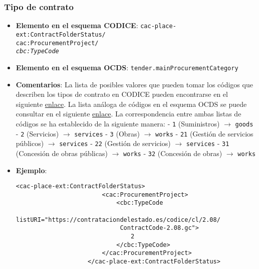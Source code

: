         \subsubsection{Tipo de contrato}
        \begin{itemize}
            \item \textbf{Elemento en el esquema CODICE}:
                \tabto{7.6cm} \texttt{cac-place-ext:ContractFolderStatus/} \\
                \tabto{7.6cm} \texttt{cac:ProcurementProject/} \\
                \tabto{7.6cm} \texttt{\textit{cbc:TypeCode}}
            \item \textbf{Elemento en el esquema OCDS}:
                \tabto{7.6cm} \texttt{tender.mainProcurementCategory}
            \item \textbf{Comentarios}: La lista de posibles valores que pueden tomar los códigos que describen los tipos de contrato en CODICE pueden encontrarse en el siguiente \href{https://contrataciondelestado.es/codice/cl/2.08/ContractCode-2.08.gc}{enlace}. La lista análoga de códigos en el esquema OCDS se puede consultar en el siguiente \href{https://standard.open-contracting.org/latest/es/schema/codelists/#procurement-category}{enlace}. La correspondencia entre ambas listas de códigos se ha establecido de la siguiente manera:
                    \subitem - \texttt{1} (Suministros) $\rightarrow$ \texttt{goods}
                    \subitem - \texttt{2} (Servicios) $\rightarrow$ \texttt{services}
                    \subitem - \texttt{3} (Obras) $\rightarrow$ \texttt{works}
                    \subitem - \texttt{21} (Gestión de servicios públicos) $\rightarrow$ \texttt{services}
                    \subitem - \texttt{22} (Gestión de servicios) $\rightarrow$ \texttt{services}
                    \subitem - \texttt{31} (Concesión de obras públicas) $\rightarrow$ \texttt{works}
                    \subitem - \texttt{32} (Concesión de obras) $\rightarrow$ \texttt{works}
            \item \textbf{Ejemplo}: \\
                \begin{lstlisting}[language=lXML]
                    <cac-place-ext:ContractFolderStatus>
                        <cac:ProcurementProject>
                            <cbc:TypeCode
                             listURI="https://contrataciondelestado.es/codice/cl/2.08/
                             ContractCode-2.08.gc">
                                2
                            </cbc:TypeCode>
                        </cac:ProcurementProject>
                    </cac-place-ext:ContractFolderStatus>
                \end{lstlisting}
                

\end{itemize}
